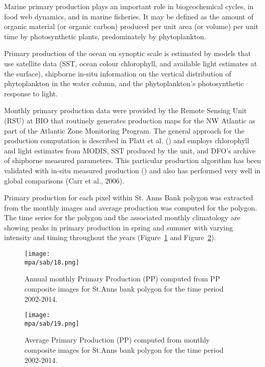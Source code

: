 \documentclass[letterpaper,portrait,11pt]{scrartcl}
\numberwithin{equation}{section}		%
\numberwithin{figure}{section}		%
\numberwithin{table}{section}				%
\newcommand*{\D}{.}
\newcommand{\biodata}{\string~/bio\D data}   %
\newcommand{\mpa}{\biodata/bio\D indicators/mpa}  %
\begin{document}
Marine primary production plays an important role in biogeochemical cycles, in food web dynamics, and in marine fisheries. It may be defined as the amount of organic material (or organic carbon) produced per unit area (or volume) per unit time by photosynthetic plants, predominately by phytoplankton.

Primary production of the ocean on synoptic scale is estimated by models that use satellite data (SST, ocean colour chlorophyll, and available light estimates at the surface), shipborne in-situ information on the vertical distribution of phytoplankton in the water column, and the phytoplankton\textquoteright s photosynthetic response to light.

Monthly primary production data were provided by the Remote Sensing Unit (RSU) at BIO that routinely generates production maps for the NW Atlantic as part of the Atlantic Zone Monitoring Program. The general approach for the production computation is described in Platt et al. (\cite{platt2008}) and employs chlorophyll and light estimates from MODIS, SST produced by the unit, and DFO's archive of shipborne measured parameters. This particular production algorithm has been validated with in-situ measured production (\cite{platt1988}) and also has performed very well in global comparisons (Carr et al., 2006).

Primary production for each pixel within St. Anns Bank polygon was extracted from the monthly images and average production was computed for the polygon. The time series for the polygon and the associated monthly climatology are showing peaks in primary production in spring and summer with varying intensity and timing throughout the years (Figure~\ref{fig:ppTSmonthly} and Figure~\ref{fig:ppTSannual}). 


\begin{figure}[h]
  \centering
  \texttt{[image: \\mpa/sab/18.png]}
  \caption{Annual monthly Primary Production (PP) computed from PP composite images for St.Anns bank polygon for the time period 2002-2014.}
    \label{fig:ppTSmonthly}
\end{figure}


\begin{figure}[h]
  \centering
  \texttt{[image: \\mpa/sab/19.png]}
  \caption{Average Primary Production (PP) computed from monthly composite images for St.Anns bank polygon for the time period 2002-2014.}
    \label{fig:ppTSannual}
\end{figure}
\end{document}
